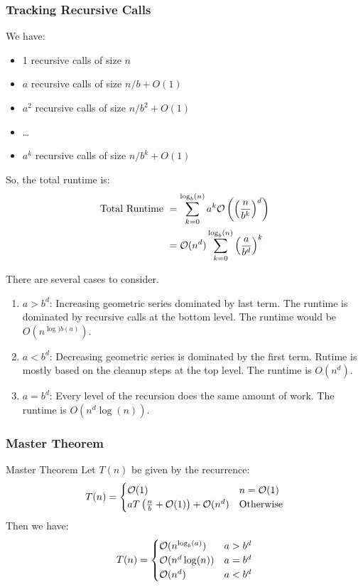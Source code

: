 \documentclass[letterpaper]{article}
\begin{document}
\subsubsection{Tracking Recursive Calls}
We have: 
\begin{itemize}
    \item 1 recursive calls of size $n$
    \item $a$ recursive calls of size $n / b + O(1)$
    \item $a^2$ recursive calls of size $n / b^2 + O(1)$
    \item \dots
    \item $a^k$ recursive calls of size $n / b^k + O(1)$
\end{itemize}
So, the total runtime is: 
\begin{equation*}
    \begin{aligned}
        \text{Total Runtime } &= \sum_{k = 0}^{\log_{b}(n)} a^k \mathcal{O}\left(\left(\frac{n}{b^k}\right)^d\right) \\ 
            &= \mathcal{O}(n^d) \sum_{k = 0}^{\log_{b}(n)} \left(\frac{a}{b^d}\right)^k
    \end{aligned}
\end{equation*}

There are several cases to consider. 
\begin{enumerate}
    \item $a > b^d$: Increasing geometric series dominated by last term. The runtime is dominated by recursive calls at the bottom level. The runtime would be $O(n^{\log){b}(a)})$.
    \item $a < b^d$: Decreasing geometric series is dominated by the first term. Rutime is mostly based on the cleanup steps at the top level. The runtime is $O(n^d)$. 
    \item $a = b^d$: Every level of the recursion does the same amount of work. The runtime is $O(n^d \log(n))$. 
\end{enumerate}

\subsubsection{Master Theorem}
\begin{theorem}{Master Theorem}{}
    Let $T(n)$ be given by the recurrence:
    \[T(n) = \begin{cases}
        \mathcal{O}(1) & n = \mathcal{O}(1) \\ 
        aT\left(\frac{n}{b} + \mathcal{O}(1)\right) + \mathcal{O}(n^d) & \text{Otherwise}
    \end{cases}\]
    Then we have: 
    \[T(n) = \begin{cases}
        \mathcal{O}(n^{\log_{b}(a)}) & a > b^d \\ 
        \mathcal{O}(n^d \log(n)) & a = b^d \\ 
        \mathcal{O}(n^d) & a < b^d
    \end{cases}\]
\end{theorem}
\end{document}
